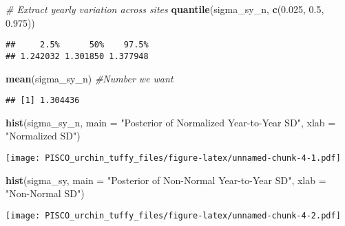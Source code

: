\documentclass[
]{article}
\newenvironment{Shaded}{\begin{snugshade}}{\end{snugshade}}
\newcommand{\AttributeTok}[1]{\textcolor[rgb]{0.13,0.29,0.53}{#1}}
\newcommand{\CommentTok}[1]{\textcolor[rgb]{0.56,0.35,0.01}{\textit{#1}}}
\newcommand{\ConstantTok}[1]{\textcolor[rgb]{0.56,0.35,0.01}{#1}}
\newcommand{\FloatTok}[1]{\textcolor[rgb]{0.00,0.00,0.81}{#1}}
\newcommand{\FunctionTok}[1]{\textcolor[rgb]{0.13,0.29,0.53}{\textbf{#1}}}
\newcommand{\NormalTok}[1]{#1}
\newcommand{\SpecialCharTok}[1]{\textcolor[rgb]{0.81,0.36,0.00}{\textbf{#1}}}
\newcommand{\StringTok}[1]{\textcolor[rgb]{0.31,0.60,0.02}{#1}}
\begin{document}
\begin{Shaded}
\begin{Highlighting}[]
\CommentTok{\# Extract yearly variation across sites}
\FunctionTok{quantile}\NormalTok{(sigma\_sy\_n, }\FunctionTok{c}\NormalTok{(}\FloatTok{0.025}\NormalTok{, }\FloatTok{0.5}\NormalTok{, }\FloatTok{0.975}\NormalTok{))}
\end{Highlighting}
\end{Shaded}

\begin{verbatim}
##     2.5%      50%    97.5% 
## 1.242032 1.301850 1.377948
\end{verbatim}

\begin{Shaded}
\begin{Highlighting}[]
\FunctionTok{mean}\NormalTok{(sigma\_sy\_n) }\CommentTok{\#Number we want}
\end{Highlighting}
\end{Shaded}

\begin{verbatim}
## [1] 1.304436
\end{verbatim}

\begin{Shaded}
\begin{Highlighting}[]
\FunctionTok{hist}\NormalTok{(sigma\_sy\_n, }\AttributeTok{main =} \StringTok{"Posterior of Normalized Year{-}to{-}Year SD"}\NormalTok{,}
     \AttributeTok{xlab =} \StringTok{"Normalized SD"}\NormalTok{)}
\end{Highlighting}
\end{Shaded}

\texttt{[image: PISCO\_urchin\_tuffy\_files/figure-latex/unnamed-chunk-4-1.pdf]}

\begin{Shaded}
\begin{Highlighting}[]
\FunctionTok{hist}\NormalTok{(sigma\_sy, }\AttributeTok{main =} \StringTok{"Posterior of Non{-}Normal Year{-}to{-}Year SD"}\NormalTok{,}
     \AttributeTok{xlab =} \StringTok{"Non{-}Normal SD"}\NormalTok{)}
\end{Highlighting}
\end{Shaded}

\texttt{[image: PISCO\_urchin\_tuffy\_files/figure-latex/unnamed-chunk-4-2.pdf]}

\begin{Shaded}
\end{Shaded}
\end{document}
